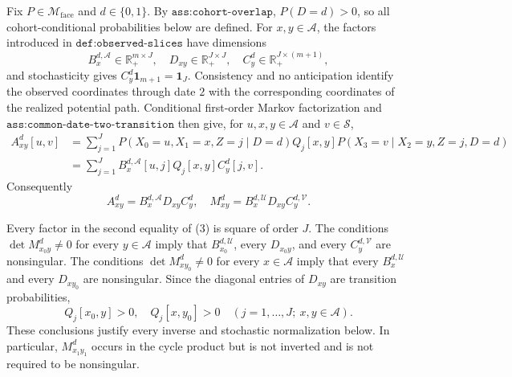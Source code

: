 Fix \(P\in\mathcal M_{\mathrm{face}}\) and \(d\in\{0,1\}\).  By \(\texttt{ass:cohort-overlap}\), \(P(D=d)>0\), so all cohort-conditional probabilities below are defined.  For \(x,y\in\mathcal A\), the factors introduced in \(\texttt{def:observed-slices}\) have dimensions
\[
 B_x^{d,\mathcal A}\in\mathbb R_+^{m\times J},\quad
 D_{xy}\in\mathbb R_+^{J\times J},\quad
 C_y^d\in\mathbb R_+^{J\times(m+1)},
 \tag{1}
\]
and stochasticity gives \(C_y^d\mathbf1_{m+1}=\mathbf1_J\).  Consistency and no anticipation identify the observed coordinates through date \(2\) with the corresponding coordinates of the realized potential path.  Conditional first-order Markov factorization and \(\texttt{ass:common-date-two-transition}\) then give, for \(u,x,y\in\mathcal A\) and \(v\in\mathcal S\),
\[
\begin{aligned}
 A_{xy}^d[u,v]
 &=\sum_{j=1}^J P(X_0=u,X_1=x,Z=j\mid D=d)Q_j[x,y]
 P(X_3=v\mid X_2=y,Z=j,D=d)\\
 &=\sum_{j=1}^J B_x^{d,\mathcal A}[u,j]Q_j[x,y]C_y^d[j,v].
\end{aligned}
\tag{2}
\]
Consequently
\[
 A_{xy}^d=B_x^{d,\mathcal A}D_{xy}C_y^d,
 \quad
 M_{xy}^d=B_x^{d,\mathcal U}D_{xy}C_y^{d,\mathcal V}.
\tag{3}
\]

Every factor in the second equality of (3) is square of order \(J\).  The conditions \(\det M_{x_0y}^d\ne0\) for every \(y\in\mathcal A\) imply that \(B_{x_0}^{d,\mathcal U}\), every \(D_{x_0y}\), and every \(C_y^{d,\mathcal V}\) are nonsingular.  The conditions \(\det M_{xy_0}^d\ne0\) for every \(x\in\mathcal A\) imply that every \(B_x^{d,\mathcal U}\) and every \(D_{xy_0}\) are nonsingular.  Since the diagonal entries of \(D_{xy}\) are transition probabilities,
\[
 Q_j[x_0,y]>0,\quad Q_j[x,y_0]>0
 \quad(j=1,\ldots,J;\ x,y\in\mathcal A).
\tag{4}
\]
These conclusions justify every inverse and stochastic normalization below.  In particular, \(M_{x_1y_1}^d\) occurs in the cycle product but is not inverted and is not required to be nonsingular.

